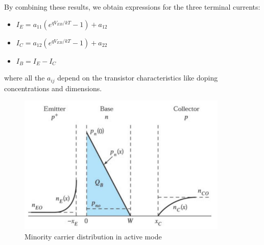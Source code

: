 By combining these results, we obtain expressions for the three terminal currents:
\begin{itemize}
    \item $I_E = a_{11} (e^{qV_{EB}/kT} - 1) + a_{12}$
    \item $I_C = a_{12} (e^{qV_{EB}/kT} - 1) + a_{22}$
    \item $I_B = I_E - I_C$
\end{itemize}
where all the $a_{ij}$ depend on the transistor characteristics like doping concentrations and dimensions.
\begin{figure}[h!]
\centering
\includegraphics[width=10cm]{figures/ch01/bjt5.jpg}
\caption{Minority carrier distribution in active mode} 
\label{fig:bjt5}
\end{figure}

